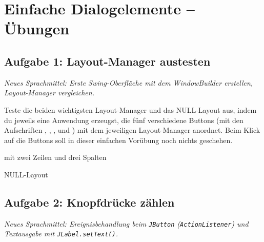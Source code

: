 \clearpage

\rehead[]{\textcolor{lightblue}{AvHG, Inf, My}}
\lohead[]{\textcolor{lightblue}{AvHG, Inf, My}}

\section{Einfache Dialogelemente -- Übungen}

\subsection{Aufgabe 1: Layout-Manager austesten \tagZusatz}
\noindent \emph{Neues Sprachmittel: Erste Swing-Oberfläche mit dem WindowBuilder erstellen, Layout-Manager vergleichen.}

Teste die beiden wichtigsten Layout-Manager und das NULL-Layout aus, indem du
jeweils eine Anwendung erzeugst, die fünf verschiedene Buttons (mit den
Aufschriften , , ,
 und ) mit dem jeweiligen Layout-Manager
anordnet. Beim Klick auf die Buttons soll in dieser einfachen Vorübung noch
nichts geschehen.

\begin{compactenum}[a)]
\item {}
\item {} mit zwei Zeilen und drei Spalten
\item NULL-Layout
\end{compactenum}


\subsection{Aufgabe 2: Knopfdrücke zählen \tagPflicht}
\noindent \emph{Neues Sprachmittel: Ereignisbehandlung beim \texttt{JButton} (\texttt{ActionListener}) und Textausgabe mit \linebreak \texttt{JLabel.setText()}.}

